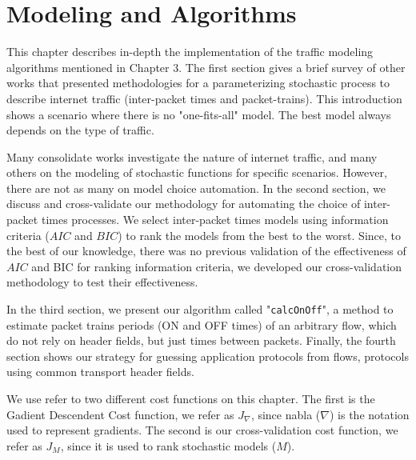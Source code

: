 \chapter{Modeling and Algorithms}\label{ch:modeling-evaluation}




This chapter describes in-depth the implementation of the traffic modeling algorithms mentioned in Chapter 3. The first section gives a brief survey of other works that presented methodologies for a parameterizing stochastic process to describe internet traffic (inter-packet times and packet-trains). This introduction shows a scenario where there is no "one-fits-all" model. The best model always depends on the type of traffic. 

Many consolidate works investigate the nature of internet traffic, and many others on the modeling of stochastic functions for specific scenarios. However, there are not as many on model choice automation. In the second section, we discuss and cross-validate our methodology for automating the choice of inter-packet times processes. We select inter-packet times models using information criteria ($AIC$ and $BIC$) to rank the models from the best to the worst.  Since, to the best of our knowledge, there was no previous validation of the effectiveness of $AIC$ and BIC for ranking information criteria, we developed our cross-validation methodology to test their effectiveness.  

In the third section, we present our algorithm called "\texttt{calcOnOff}", a method to estimate packet trains periods (ON and OFF times) of an arbitrary flow, which do not rely on header fields, but just times between packets. Finally, the fourth section shows our strategy for guessing application protocols from flows, protocols using common transport header fields.


We use refer to two different cost functions on this chapter. The first is the Gadient Descendent Cost function, we refer as $J_\nabla$, since nabla ($\nabla$) is the notation used to represent gradients. The second is our cross-validation cost function, we refer as $J_M$, since it is used to rank stochastic models ($M$).


